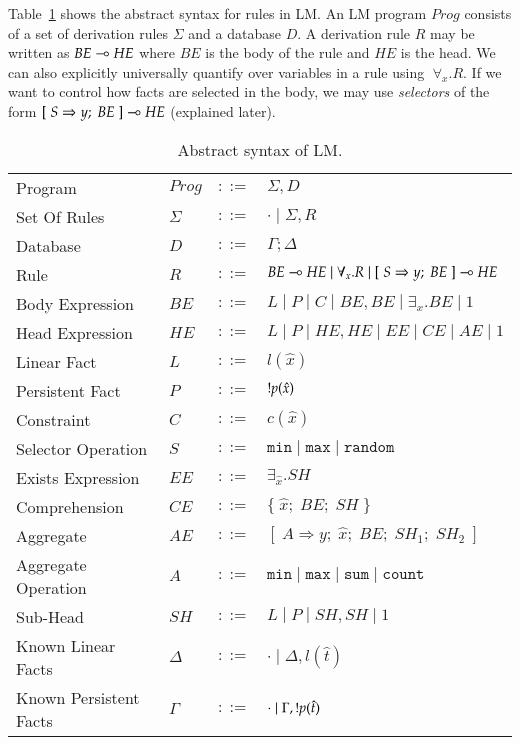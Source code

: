 
\newcommand{\selector}[0]{[\; S \Rightarrow y; \; BE \;] \lolli HE}
\newcommand{\comprehension}[0]{\{ \; \widehat{x}; \; BE; \; SH \; \}}
\newcommand{\aggregate}[0]{[\; A \Rightarrow y; \; \widehat{x}; \; BE; \; SH_1; \; SH_2 \;]}

Table~\ref{tbl:ast} shows the abstract syntax for rules in LM.
An LM program $Prog$ consists of a set of derivation rules $\Sigma$ and a database $D$.
A derivation rule $R$ may be written as $BE \multimap HE$ where $BE$ is the body of the rule and
$HE$ is the head.
We can also explicitly universally quantify over variables in a rule using $\; \forall_{x}. R$.
If we want to control how facts are selected in the body, we may use \emph{selectors} of
the form $\selector$ (explained later).

\begin{table}[h]
\centering
\begin{tabular}{ l l c l }
  Program & $Prog$ & $::=$ & $\Sigma, D$ \\
  Set Of Rules & $\Sigma$ & $::=$ & $\cdot \; | \; \Sigma, R$\\
  Database & $D$ & $::=$ & $\Gamma; \Delta$ \\
  Rule & $R$ & $::=$ & $BE \lolli HE \; | \; \forall_{x}. R \; | \; \selector$ \\
  Body Expression & $BE$ & $::=$ & $L \; | \; P \; | \; C \; | \; BE, BE \; | \; \exists_{x}. BE \; | \; 1$\\
  Head Expression & $HE$ & $::=$ & $L \; | \; P \; | \; HE, HE \; | \; EE \; | \; CE \; | \; AE \; | \; 1$\\
  
  Linear Fact & $L$ & $::=$ & $l(\hat{x})$\\
  Persistent Fact & $P$ & $::=$ & ${!} p(\hat{x})$\\
  Constraint & $C$ & $::=$ & $c(\hat{x})$ \\
  Selector Operation & $S$ & $::=$ & $\mathtt{min} \; | \; \mathtt{max} \; | \; \mathtt{random}$\\
  
  Exists Expression & $EE$ & $::=$ & $\exists_{\widehat{x}}. SH$ \\
  Comprehension & $CE$ & $::=$ & $\comprehension$ \\
  Aggregate & $AE$ & $::=$ & $\aggregate$ \\
  Aggregate Operation & $A$ & $::=$ & $\mathtt{min} \; | \; \mathtt{max} \; | \; \mathtt{sum} \; | \; \mathtt{count}$ \\
  
  Sub-Head & $SH$ & $::=$ & $L \; | \; P \; | \; SH, SH \; | \; 1$\\
  
  Known Linear Facts & $\Delta$ & $::=$ & $\cdot \; | \; \Delta, l(\hat{t})$ \\
  Known Persistent Facts & $\Gamma$ & $::=$ & $\cdot \; | \; \Gamma, {!} p(\hat{t})$ \\
\end{tabular}
\caption{Abstract syntax of LM.}\label{tbl:ast}
\end{table}

